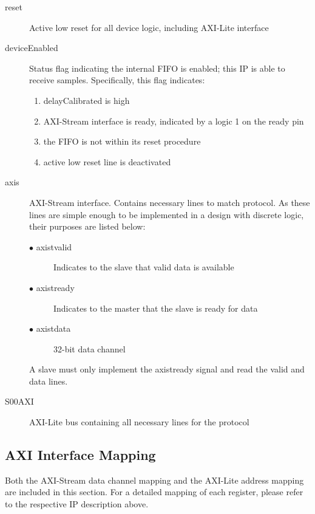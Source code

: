 \documentclass[11pt]{article}
\begin{document}
\begin{description}
	\item[reset]Active low reset for all device logic, including AXI-Lite interface
	\item[deviceEnabled]Status flag indicating the internal FIFO is enabled; this IP is able to receive samples. Specifically, this flag indicates:\hfill
		\begin{enumerate}
			\item delayCalibrated is high 
			\item AXI-Stream interface is ready, indicated by a logic 1 on the ready pin
			\item the FIFO is not within its reset procedure
			\item active low reset line is deactivated
		\end{enumerate}
	\item[axis]AXI-Stream interface. Contains necessary lines to match protocol. As these lines are simple enough to be implemented in a design with
		discrete logic, their purposes are listed below:\hfill
		\begin{description}
			\item[$\bullet$ axis\textunderscore tvalid]Indicates to the slave that valid data is available
			\item[$\bullet$ axis\textunderscore tready]Indicates to the master that the slave is ready for data
			\item[$\bullet$ axis\textunderscore tdata]32-bit data channel
		\end{description}
		A slave must only implement the axis\textunderscore tready signal and read the valid and data lines.
	\item[S00\textunderscore AXI]AXI-Lite bus containing all necessary lines for the protocol
\end{description}
\subsection{AXI Interface Mapping}
Both the AXI-Stream data channel mapping and the AXI-Lite address mapping are included in this section. For a detailed mapping of each register, please 
refer to the respective IP description above.
\end{document}
